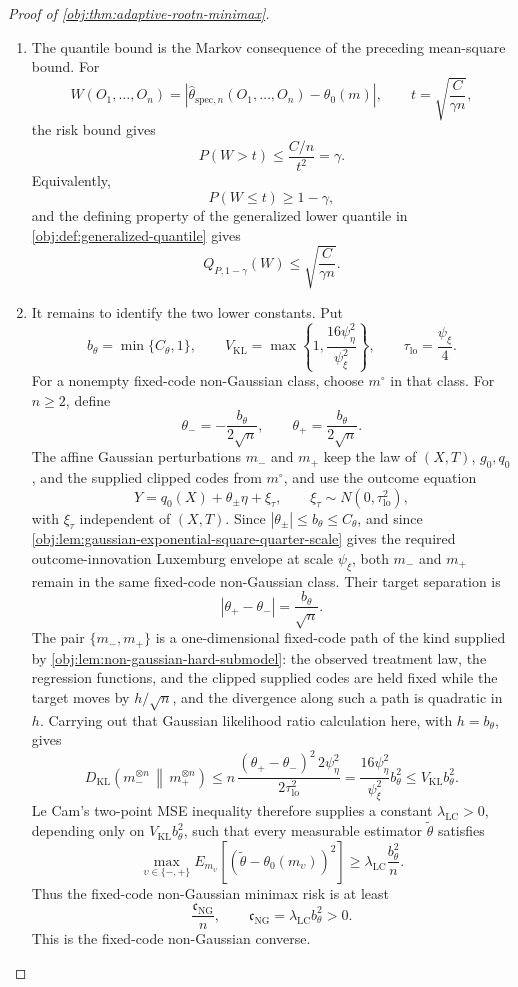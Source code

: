 \documentclass[11pt]{article}
\begin{document}
\begin{proof}[Proof of \cref{obj:thm:adaptive-rootn-minimax}]
\begin{enumerate}
\item The quantile bound is the Markov consequence of the preceding mean-square bound.  For
\[
W(O_1,\ldots,O_n)
=
|\widehat\theta_{\mathrm{spec},n}(O_1,\ldots,O_n)-\theta_0(m)|,
\qquad
t=\sqrt{\frac{C}{\gamma n}},
\]
the risk bound gives
\[
P(W>t)\le \frac{C/n}{t^2}=\gamma.
\]
Equivalently,
\[
P(W\le t)\ge 1-\gamma,
\]
and the defining property of the generalized lower quantile in \cref{obj:def:generalized-quantile} gives
\[
Q_{P,1-\gamma}(W)\le \sqrt{\frac{C}{\gamma n}}.
\]

\item It remains to identify the two lower constants.  Put
\[
b_{\theta}=\min\{C_{\theta},1\},
\qquad
V_{\mathrm{KL}}=\max\left\{1,\frac{16\psi_{\eta}^2}{\psi_{\xi}^2}\right\},
\qquad
\tau_{\mathrm{lo}}=\frac{\psi_{\xi}}4.
\]
For a nonempty fixed-code non-Gaussian class, choose \(m^{\circ}\) in that class.  For \(n\ge2\), define
\[
\theta_-=-\frac{b_{\theta}}{2\sqrt n},
\qquad
\theta_+=\frac{b_{\theta}}{2\sqrt n}.
\]
The affine Gaussian perturbations \(m_-\) and \(m_+\) keep the law of \((X,T)\), \(g_0,q_0\), and the supplied clipped codes from \(m^{\circ}\), and use the outcome equation
\[
Y=q_0(X)+\theta_{\pm}\eta+\xi_{\tau},
\qquad
\xi_{\tau}\sim N(0,\tau_{\mathrm{lo}}^2),
\]
with \(\xi_{\tau}\) independent of \((X,T)\).  Since \(|\theta_{\pm}|\le b_{\theta}\le C_{\theta}\), and since \cref{obj:lem:gaussian-exponential-square-quarter-scale} gives the required outcome-innovation Luxemburg envelope at scale \(\psi_{\xi}\), both \(m_-\) and \(m_+\) remain in the same fixed-code non-Gaussian class.  Their target separation is
\[
|\theta_+-\theta_-|=\frac{b_{\theta}}{\sqrt n}.
\]
The pair \(\{m_-,m_+\}\) is a one-dimensional fixed-code path of the kind supplied by \cref{obj:lem:non-gaussian-hard-submodel}: the observed treatment law, the regression functions, and the clipped supplied codes are held fixed while the target moves by \(h/\sqrt n\), and the divergence along such a path is quadratic in \(h\).  Carrying out that Gaussian likelihood ratio calculation here, with \(h=b_{\theta}\), gives
\[
D_{\mathrm{KL}}\!\left(m_-^{\otimes n}\,\middle\|\,m_+^{\otimes n}\right)
\le
n\,\frac{(\theta_+-\theta_-)^2\,2\psi_{\eta}^2}{2\tau_{\mathrm{lo}}^2}
=
\frac{16\psi_{\eta}^2}{\psi_{\xi}^2}b_{\theta}^2
\le
V_{\mathrm{KL}}b_{\theta}^2.
\]
Le Cam's two-point MSE inequality therefore supplies a constant \(\lambda_{\mathrm{LC}}>0\), depending only on \(V_{\mathrm{KL}}b_{\theta}^2\), such that every measurable estimator \(\widetilde\theta\) satisfies
\[
\max_{\upsilon\in\{-,+\}}
E_{m_{\upsilon}}\!\left[
(\widetilde\theta-\theta_0(m_{\upsilon}))^2
\right]
\ge
\lambda_{\mathrm{LC}}\frac{b_{\theta}^2}{n}.
\]
Thus the fixed-code non-Gaussian minimax risk is at least
\[
\frac{\mathfrak c_{\mathrm{NG}}}{n},
\qquad
\mathfrak c_{\mathrm{NG}}=\lambda_{\mathrm{LC}}b_{\theta}^2>0.
\]
This is the fixed-code non-Gaussian converse. %


\end{enumerate}
\end{proof}
\end{document}
